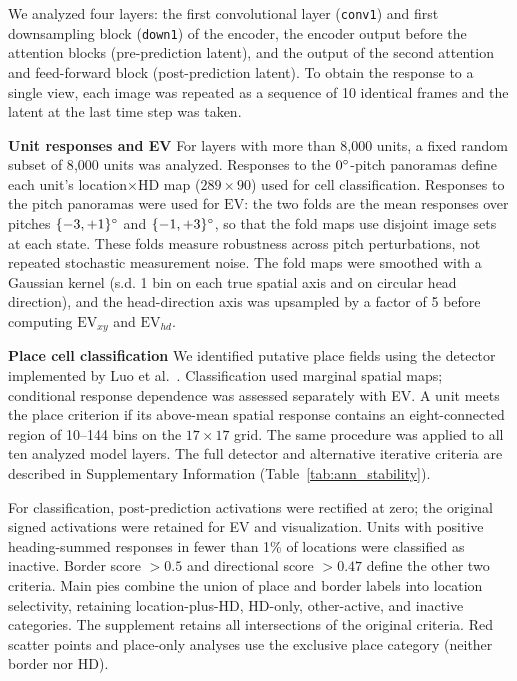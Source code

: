 \documentclass[11pt]{article}
\begin{document}
We analyzed four layers: the first convolutional layer (\texttt{conv1}) and first downsampling block (\texttt{down1}) of the encoder, the encoder output before the attention blocks (pre-prediction latent), and the output of the second attention and feed-forward block (post-prediction latent). To obtain the response to a single view, each image was repeated as a sequence of 10 identical frames and the latent at the last time step was taken.

{\bf Unit responses and EV}
For layers with more than 8{,}000 units, a fixed random subset of 8{,}000 units was analyzed. Responses to the $0\degree$-pitch panoramas define each unit's location$\times$HD map ($289\times90$) used for cell classification. Responses to the pitch panoramas were used for $\mathrm{EV}$: the two folds are the mean responses over pitches $\{-3,+1\}\degree$ and $\{-1,+3\}\degree$, so that the fold maps use disjoint image sets at each state. These folds measure robustness across pitch perturbations, not repeated stochastic measurement noise. The fold maps were smoothed with a Gaussian kernel (s.d. 1 bin on each true spatial axis and on circular head direction), and the head-direction axis was upsampled by a factor of 5 before computing $\mathrm{EV}_{xy}$ and $\mathrm{EV}_{hd}$.

{\bf Place cell classification}
We identified putative place fields using the detector implemented by Luo et al.~\cite{Luo2024}. Classification used marginal spatial maps; conditional response dependence was assessed separately with EV. A unit meets the place criterion if its above-mean spatial response contains an eight-connected region of 10--144 bins on the $17\times17$ grid. The same procedure was applied to all ten analyzed model layers. The full detector and alternative iterative criteria are described in Supplementary Information (Table~\ref{tab:ann_stability}).

For classification, post-prediction activations were rectified at zero; the original signed activations were retained for EV and visualization. Units with positive heading-summed responses in fewer than 1\% of locations were classified as inactive. Border score $>0.5$ and directional score $>0.47$ define the other two criteria. Main pies combine the union of place and border labels into location selectivity, retaining location-plus-HD, HD-only, other-active, and inactive categories. The supplement retains all intersections of the original criteria. Red scatter points and place-only analyses use the exclusive place category (neither border nor HD).
\end{document}
